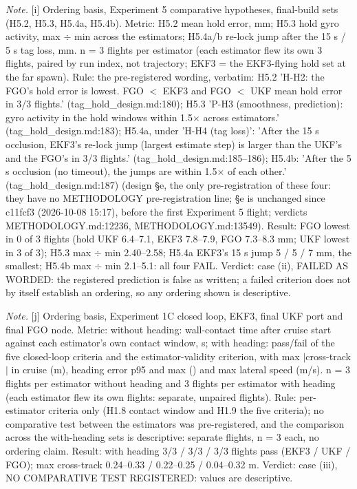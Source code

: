 \begin{table}[htbp]
\textit{Note.} [i] Ordering basis, Experiment 5 comparative hypotheses, final-build sets (H5.2, H5.3, H5.4a, H5.4b). Metric: H5.2 mean hold error, mm; H5.3 hold gyro activity, max $\div$ min across the estimators; H5.4a/b re-lock jump after the 15 s / 5 s tag loss, mm. n = 3 flights per estimator (each estimator flew its own 3 flights, paired by run index, not trajectory; EKF3 = the EKF3-flying hold set at the far spawn). Rule: the pre-registered wording, verbatim: H5.2 'H-H2: the FGO's hold error is lowest. FGO $<$ EKF3 and FGO $<$ UKF mean hold error in 3/3 flights.' (tag\_hold\_design.md:180); H5.3 'P-H3 (smoothness, prediction): gyro activity in the hold windows within 1.5$\times$ across estimators.' (tag\_hold\_design.md:183); H5.4a, under 'H-H4 (tag loss)': 'After the 15 s occlusion, EKF3's re-lock jump (largest estimate step) is larger than the UKF's and the FGO's in 3/3 flights.' (tag\_hold\_design.md:185--186); H5.4b: 'After the 5 s occlusion (no timeout), the jumps are within 1.5$\times$ of each other.' (tag\_hold\_design.md:187) (design \S{}e, the only pre-registration of these four: they have no METHODOLOGY pre-registration line; \S{}e is unchanged since c11fcf3 (2026-10-08 15:17), before the first Experiment 5 flight; verdicts METHODOLOGY.md:12236, METHODOLOGY.md:13549). Result: FGO lowest in 0 of 3 flights (hold UKF 6.4--7.1, EKF3 7.8--7.9, FGO 7.3--8.3 mm; UKF lowest in 3 of 3); H5.3 max $\div$ min 2.40--2.58; H5.4a EKF3's 15 s jump 5 / 5 / 7 mm, the smallest; H5.4b max $\div$ min 2.1--5.1: all four FAIL. Verdict: case (ii), FAILED AS WORDED: the registered prediction is false as written; a failed criterion does not by itself establish an ordering, so any ordering shown is descriptive.\par
\textit{Note.} [j] Ordering basis, Experiment 1C closed loop, EKF3, final UKF port and final FGO node. Metric: without heading: wall-contact time after cruise start against each estimator's own contact window, s; with heading: pass/fail of the five closed-loop criteria and the estimator-validity criterion, with max $|$cross-track$|$ in cruise (m), heading error p95 and max (\textdegree{}) and max lateral speed (m/s). n = 3 flights per estimator without heading and 3 flights per estimator with heading (each estimator flew its own flights: separate, unpaired flights). Rule: per-estimator criteria only (H1.8 contact window and H1.9 the five criteria); no comparative test between the estimators was pre-registered, and the comparison across the with-heading sets is descriptive: separate flights, n = 3 each, no ordering claim. Result: with heading 3/3 / 3/3 / 3/3 flights pass (EKF3 / UKF / FGO); max cross-track 0.24--0.33 / 0.22--0.25 / 0.04--0.32 m. Verdict: case (iii), NO COMPARATIVE TEST REGISTERED: values are descriptive.\par

\end{table}
